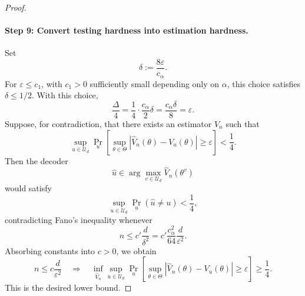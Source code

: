 \documentclass{article}
\theoremstyle{plain}
\theoremstyle{definition}
\theoremstyle{remark}
\begin{document}
\begin{proof}
\paragraph{Step 9: Convert testing hardness into estimation hardness.}
Set
\[
    \delta:=\frac{8\varepsilon}{c_\alpha}.
\]
For \(\varepsilon\le c_1\), with \(c_1>0\) sufficiently small depending only on
\(\alpha\), this choice satisfies \(\delta\le 1/2\). With this choice,
\[
    \frac{\Delta}{4}
    =
    \frac{1}{4}\cdot \frac{c_\alpha}{2}\delta
    =
    \frac{c_\alpha\delta}{8}
    =
    \varepsilon.
\]
Suppose, for contradiction, that there exists an estimator \(\widehat V_n\) such
that
\[
    \sup_{u\in\mathcal U_d}
    \Pr_u\!\left[
        \sup_{\theta\in\Theta}
        |\widehat V_n(\theta)-V_u(\theta)|
        \ge \varepsilon
    \right]
    <
    \frac14.
\]
Then the decoder
\[
    \widehat u
    \in
    \arg\max_{v\in\mathcal U_d} \widehat V_n(\theta^v)
\]
would satisfy
\[
    \sup_{u\in\mathcal U_d}
    \Pr_u(\widehat u\ne u)
    <
    \frac14,
\]
contradicting Fano's inequality whenever
\[
    n\le c'\frac{d}{\delta^2}
    =
    c'\frac{c_\alpha^2}{64}\frac{d}{\varepsilon^2}.
\]
Absorbing constants into \(c>0\), we obtain
\[
    n\le c\frac{d}{\varepsilon^2}
    \quad\Longrightarrow\quad
    \inf_{\widehat V_n}
    \sup_{u\in\mathcal U_d}
    \Pr_u\!\left[
        \sup_{\theta\in\Theta}
        |\widehat V_n(\theta)-V_u(\theta)|
        \ge \varepsilon
    \right]
    \ge
    \frac14.
\]
This is the desired lower bound.
\end{proof}
\end{document}
